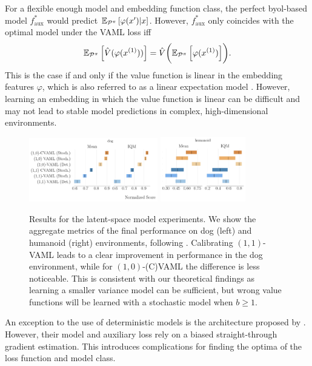 For a flexible enough model and embedding function class, the perfect \ac{byol}-based model $f^*_\mathrm{aux}$ would predict $\mathbb{E}_{\mathcal{P}^\pi}\left[  \varphi(x')| x \right]$.
However, $f^*_\mathrm{aux}$ only coincides with the optimal model under the VAML loss iff
\begin{align}
    \mathbb{E}_{\mathcal{P}^\pi}\left[  \hat{V}(\varphi(x^{(1)})) \right] = \hat{V}\biggl(\mathbb{E}_{\mathcal{P}^\pi}\left[  \varphi(x^{(1)}) \right]\biggr).
\end{align}
This is the case if and only if the value function is linear in the embedding features $\varphi$, which is also referred to as a linear expectation model \cite{wan2019planning}.
However,  learning an embedding in which the value function is linear can be difficult and may not lead to stable model predictions in complex, high-dimensional environments.

\begin{figure}[t]
\centering
   \includegraphics[width=0.5\textwidth]{figures/lambda/plts/agg_dog.pdf} 
   \includegraphics[width=0.33\textwidth]{figures/lambda/plts/agg_hum.pdf} 
   \caption{Results for the latent-space model experiments. We show the aggregate metrics of the final performance on dog (left) and humanoid (right) environments, following \cite{agarwal2021deep}. Calibrating $(1,1)$-VAML leads to a clear improvement in performance in the dog environment, while for $(1,0)$-(C)VAML the difference is less noticeable. This is consistent with our theoretical findings as learning a smaller variance model can be sufficient, but wrong value functions will be learned with a stochastic model when $b\geq1$.}
   \label{fig:cvaml:agg_results}
\end{figure}

An exception to the use of deterministic models is the architecture proposed by \textcite{antonoglou2022planning}.
However, their model and auxiliary loss rely on a biased straight-through gradient estimation.
This introduces complications for finding the optima of the loss function and model class.

